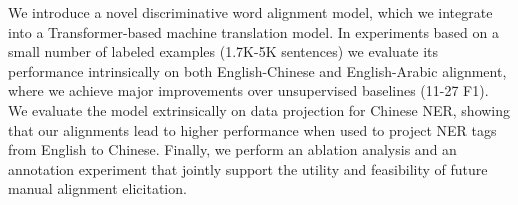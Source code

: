 We introduce a novel discriminative word alignment model, which we integrate into a Transformer-based machine translation model. In experiments based on a small number of labeled examples (\∼1.7K-5K sentences) we evaluate its performance intrinsically on both English-Chinese and English-Arabic alignment, where we achieve major improvements over unsupervised baselines (11-27 F1). We evaluate the model extrinsically on data projection for Chinese NER, showing that our alignments lead to higher performance when used to project NER tags from English to Chinese. Finally, we perform an ablation analysis and an annotation experiment that jointly support the utility and feasibility of future manual alignment elicitation.